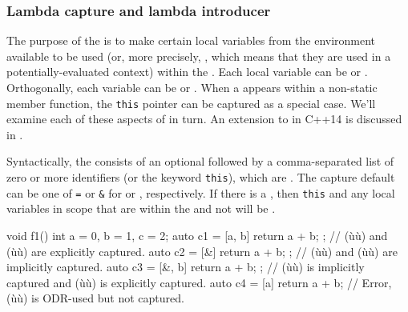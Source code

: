 \subsubsection[Lambda capture and lambda introducer]{Lambda capture and lambda introducer}\label{lambda-capture-and-lambda-introducer}

The purpose of the  is to make certain local
variables from the environment available to be used (or, more precisely,
, which means that they are used in a
potentially-evaluated context) within the . Each
local variable can be  or . Orthogonally, each variable can be  or . When a  appears within a non-static member function, the
\lstinline!this! pointer can be captured as a special case. We'll examine
each of these aspects of  in turn. An extension
to  in C++14 is discussed in .

Syntactically, the  consists of an optional
 followed by a comma-separated list of zero or
more identifiers (or the keyword \lstinline!this!), which are
. The capture default can be one of
\lstinline!=! or \lstinline!&! for  or
, respectively. If there is a
, then \lstinline!this! and any local variables in
scope that are  within the  and not
 will be .

\begin{emcppslisting}
void f1()
{
    int a = 0, b = 1, c = 2;
    auto c1 = [a, b]{ return a + b; };
        // (ù{}ù) and (ù{}ù) are explicitly captured.
    auto c2 = [&]{ return a + b; };
        // (ù{}ù) and (ù{}ù) are implicitly captured.
    auto c3 = [&, b]{ return a + b; };
        // (ù{}ù) is implicitly captured and (ù{}ù) is explicitly captured.
    auto c4 = [a]{ return a + b; }
        // Error, (ù{}ù) is ODR-used but not captured.
}
\end{emcppslisting}
    

